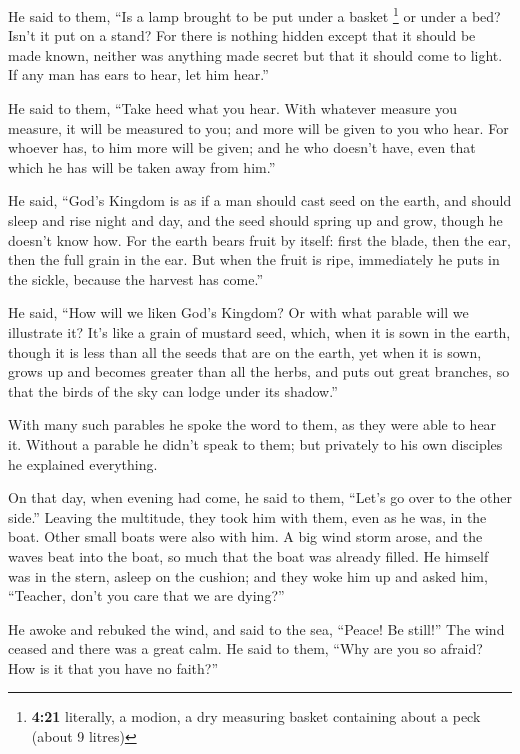  He said to them, ``Is a lamp brought to be put under a
basket \footnote{\textbf{4:21} literally, a modion, a dry measuring
  basket containing about a peck (about 9 litres)} or under a bed? Isn't
it put on a stand?  For there is nothing hidden except
that it should be made known, neither was anything made secret but that
it should come to light.  If any man has ears to hear,
let him hear.''

 He said to them, ``Take heed what you hear. With
whatever measure you measure, it will be measured to you; and more will
be given to you who hear.  For whoever has, to him more
will be given; and he who doesn't have, even that which he has will be
taken away from him.''

 He said, ``God's Kingdom is as if a man should cast seed
on the earth,  and should sleep and rise night and day,
and the seed should spring up and grow, though he doesn't know how.
 For the earth bears fruit by itself: first the blade,
then the ear, then the full grain in the ear.  But when
the fruit is ripe, immediately he puts in the sickle, because the
harvest has come.''

 He said, ``How will we liken God's Kingdom? Or with what
parable will we illustrate it?  It's like a grain of
mustard seed, which, when it is sown in the earth, though it is less
than all the seeds that are on the earth,  yet when it is
sown, grows up and becomes greater than all the herbs, and puts out
great branches, so that the birds of the sky can lodge under its
shadow.''

 With many such parables he spoke the word to them, as
they were able to hear it.  Without a parable he didn't
speak to them; but privately to his own disciples he explained
everything.

 On that day, when evening had come, he said to them,
``Let's go over to the other side.''  Leaving the
multitude, they took him with them, even as he was, in the boat. Other
small boats were also with him.  A big wind storm arose,
and the waves beat into the boat, so much that the boat was already
filled.  He himself was in the stern, asleep on the
cushion; and they woke him up and asked him, ``Teacher, don't you care
that we are dying?''

 He awoke and rebuked the wind, and said to the sea,
``Peace! Be still!'' The wind ceased and there was a great calm.
 He said to them, ``Why are you so afraid? How is it that
you have no faith?''

